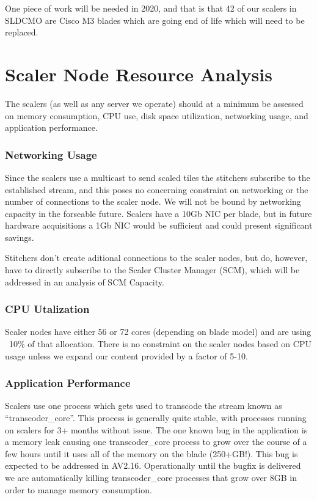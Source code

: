 \documentclass{article}
\begin{document}
One piece of work will be needed in 2020, and that is that 42 of our scalers in SLDCMO are Cisco M3 blades which are going end of life which will need to be replaced. 



\section{Scaler Node Resource Analysis}
\label{SECTION-NODES}

The scalers (as well as any server we operate) should at a minimum be assessed on memory consumption, CPU use, disk space utilization, networking usage, and application performance. 

\subsubsection{Networking Usage}
\label{SECTION-Networking}

Since the scalers use a multicast to send scaled tiles the stitchers subscribe to the established stream, and this poses no concerning constraint on networking or the number of connections to the scaler node. We will not be bound by networking capacity in the forseable future. Scalers have a 10Gb NIC per blade, but in future hardware acquisitions a 1Gb NIC would be sufficient and could present significant savings. 

Stitchers don't create aditional connections to the scaler nodes, but do, however, have to directly subscribe to the Scaler Cluster Manager (SCM), which will be addressed in an analysis of SCM Capacity.

\subsubsection{CPU Utalization}
\label{SECTION-CPUUse}

Scaler nodes have either 56 or 72 cores (depending on blade model) and are using ~10\% of that allocation. There is no constraint on the scaler nodes based on CPU usage unless we expand our content provided by a factor of 5-10. 

\subsubsection{Application Performance}
\label{SECTION-APPPerf}

Scalers use one process which gets used to transcode the stream known as ``transcoder\_core''. This process is generally quite stable, with processes running on scalers for 3+ months without issue. The one known bug in the application is a memory leak causing one transcoder\_core process to grow over the course of a few hours until it uses all of the memory on the blade (250+GB!). This bug is expected to be addressed in AV2.16. Operationally until the bugfix is delivered we are automatically killing transcoder\_core processes that grow over 8GB in order to manage memory consumption. 
\end{document}
